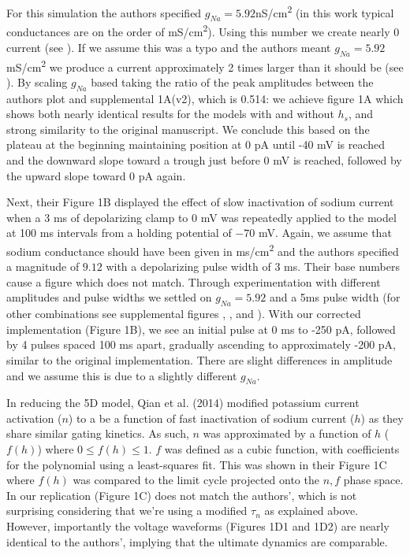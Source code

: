 For this simulation the authors specified $g_{Na}=5.92$nS/cm\textsuperscript{2} (in this work typical conductances are on the order of mS/cm\textsuperscript{2}). Using this number we create nearly 0 current (see ). If we assume this was a typo and the authors meant $g_{Na}=5.92$ mS/cm\textsuperscript{2} we produce a current approximately 2 times larger than it should be (see ). By scaling $g_{Na}$ based taking the ratio of the peak amplitudes between the authors plot and supplemental 1A(v2), which is 0.514: we achieve figure 1A which shows both nearly identical results for the models with and without $h_s$, and strong similarity to the original manuscript. We conclude this based on the plateau at the beginning maintaining position at 0 pA until -40 mV is reached and the downward slope toward a trough just before 0 mV is reached, followed by the upward slope toward 0 pA again. 

Next, their Figure 1B displayed the effect of slow inactivation of sodium current when a 3 ms of depolarizing clamp to 0 mV was repeatedly applied to the model at 100 ms intervals from a holding potential of $-70$ mV. Again, we assume that sodium conductance should have been given in ms/cm\textsuperscript{2} and the authors specified a magnitude of $9.12$ with a depolarizing pulse width of 3 ms. Their base numbers cause a figure which does not match. Through experimentation with different amplitudes and pulse widths we settled on $g_{Na}=5.92$ and a 5ms pulse width (for other combinations see supplemental figures , , and ). With our corrected implementation (Figure 1B), we see an initial pulse at 0 ms to -250 pA, followed by 4 pulses spaced 100 ms apart, gradually ascending to approximately -200 pA, similar to the original implementation. There are slight differences in amplitude and we assume this is due to a slightly different $g_{Na}$.

In reducing the 5D model, Qian et al. (2014) modified potassium current activation ($n$) to a be a function of fast inactivation of sodium current ($h$) as they share similar gating kinetics. As such, $n$ was approximated by a function of $h$ ($f(h)$) where $0\leq f(h)\leq 1$. $f$ was defined as a cubic function, with coefficients for the polynomial using a least-squares fit. This was shown in their Figure 1C where $f(h)$ was compared to the limit cycle projected onto the $n, f$ phase space. In our replication (Figure 1C) does not match the authors', which is not surprising considering that we're using a modified $\tau_n$ as explained above. However, importantly the voltage waveforms (Figures 1D1 and 1D2) are nearly identical to the authors', implying that the ultimate dynamics are comparable. 

